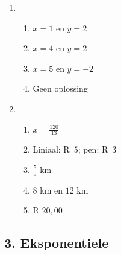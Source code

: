 {\begin{multicols}{3}
\begin{enumerate}[noitemsep, label=\textbf{\arabic*}. ]
\item %
\begin{enumerate}[noitemsep,label=\textbf{(\alph*)}]
\item $x=1$ en $y=2$%
\item $x=4$ en $y=2$%
\item $x=5$ en $y=-2$%
\item Geen oplossing%
\end{enumerate}

\item %
\begin{enumerate}[noitemsep,label=\textbf{(\alph*)}]
\item $x=\frac{120}{13}$%
\item Liniaal: R~$5$; pen: R~$3$%
\item $\frac{5}{9}$ km%
\item $8$ km en $12$ km%
\item R $20,00$%
   

\end{enumerate}
\end{enumerate}

\end{multicols}

\subsection*{3. Eksponentiele}
\begin{multicols}{3}

\end{multicols}}
